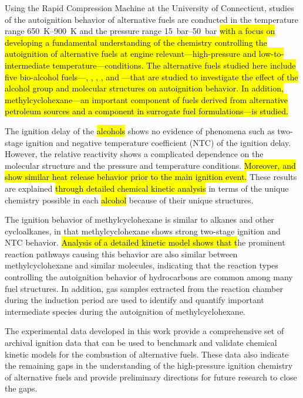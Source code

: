 
% 
Using the Rapid Compression Machine at the University of Connecticut,
studies of the autoignition behavior of alternative fuels are conducted
in the temperature range \SIrange{650}{900}{\kelvin} and the pressure
range \SIrange{15}{50}{\bar} \hl{with a focus
on developing a fundamental understanding of the chemistry controlling
the autoignition of alternative fuels at engine relevant---high-pressure and low-to-intermediate
temperature---conditions. The alternative fuels
studied here include five bio-alcohol fuels---\nBuOH{}, \sBuOH{}, \tBuOH{},
\iBuOH{}, and \iPeOH{}---that are studied to investigate the effect of
the alcohol group and molecular structures on autoignition behavior. In
addition, methylcyclohexane---an important component of fuels derived from
alternative petroleum sources and a component in surrogate fuel
formulations---is studied.}

The ignition delay of the \hl{alcohols} shows no evidence of phenomena such
as two-stage ignition and negative temperature coefficient (NTC) of the
ignition delay. However, the relative reactivity shows a complicated
dependence on the molecular structure and the pressure and temperature
conditions. \hl{Moreover, \iPeOH{} and \tBuOH{} show similar heat
release behavior prior to the main ignition event.} These results are
explained \hl{through detailed chemical kinetic analysis} in terms of the
unique chemistry possible in each \hl{alcohol} because
of their unique structures.

The ignition behavior of methylcyclohexane is similar to alkanes
and other cycloalkanes, in that methylcyclohexane shows strong two-stage
ignition and NTC behavior. \hl{Analysis of a detailed kinetic model shows
that t}he prominent reaction pathways causing this behavior are also
similar between methylcyclohexane and similar molecules, indicating that
the reaction types controlling the autoignition behavior of hydrocarbons
are common among many fuel structures. In addition, gas samples extracted
from the reaction chamber during the induction period are used to identify
and quantify important intermediate species during the autoignition of
methylcyclohexane.

The experimental data developed in this work provide a comprehensive set
of archival ignition data that can be used to benchmark and validate
chemical kinetic models for the combustion of alternative fuels. These
data also indicate the remaining gaps in the understanding of the
high-pressure ignition chemistry of alternative fuels and provide preliminary
directions for future research to close the gaps.
% 
